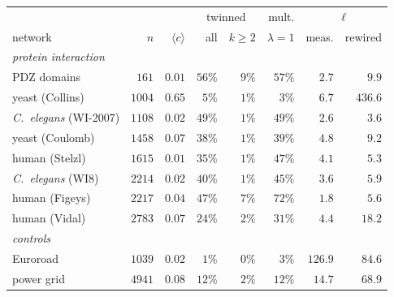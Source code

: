 \begin{center}
\footnotesize\setlength{\tabcolsep}{3pt}
\begin{tabular}{lrrrrrrr}
\hline
 & & & \multicolumn{2}{c}{twinned} & mult. & \multicolumn{2}{c}{$\ell$}\\
network & $n$ & $\langle c\rangle$ & all & $k\!\geq\!2$ & $\lambda{=}1$ & meas. & rewired\\
\hline
\multicolumn{8}{l}{\emph{protein interaction}}\\
\quad PDZ domains & $161$ & $0.01$ & $56\%$ & $9\%$ & $57\%$ & $2.7$ & $9.9$\\
\quad yeast (Collins) & $1004$ & $0.65$ & $5\%$ & $1\%$ & $3\%$ & $6.7$ & $436.6$\\
\quad \emph{C.\ elegans} (WI-2007) & $1108$ & $0.02$ & $49\%$ & $1\%$ & $49\%$ & $2.6$ & $3.6$\\
\quad yeast (Coulomb) & $1458$ & $0.07$ & $38\%$ & $1\%$ & $39\%$ & $4.8$ & $9.2$\\
\quad human (Stelzl) & $1615$ & $0.01$ & $35\%$ & $1\%$ & $47\%$ & $4.1$ & $5.3$\\
\quad \emph{C.\ elegans} (WI8) & $2214$ & $0.02$ & $40\%$ & $1\%$ & $45\%$ & $3.6$ & $5.9$\\
\quad human (Figeys) & $2217$ & $0.04$ & $47\%$ & $7\%$ & $72\%$ & $1.8$ & $5.6$\\
\quad human (Vidal) & $2783$ & $0.07$ & $24\%$ & $2\%$ & $31\%$ & $4.4$ & $18.2$\\
\multicolumn{8}{l}{\emph{controls}}\\
\quad Euroroad & $1039$ & $0.02$ & $1\%$ & $0\%$ & $3\%$ & $126.9$ & $84.6$\\
\quad power grid & $4941$ & $0.08$ & $12\%$ & $2\%$ & $12\%$ & $14.7$ & $68.9$\\
\hline
\end{tabular}
\end{center}
